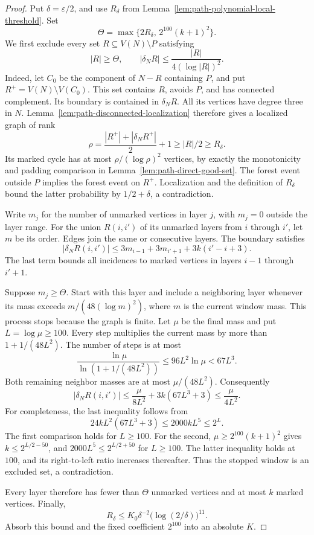 \begin{proof}
Put $\delta=\varepsilon/2$, and use $R_\delta$ from
Lemma~\ref{lem:path-polynomial-local-threshold}.
Set
\[
 \Theta=\max\{2R_\delta,\,2^{100}(k+1)^2\}.
\]
We first exclude every set $R\subseteq V(N)\setminus P$ satisfying
\[
 |R|\ge\Theta,
 \qquad
 |\delta_N R|\le\frac{|R|}{4(\log|R|)^2}.
\]
Indeed, let $C_0$ be the component of $N-R$ containing $P$, and put
$R^+=V(N)\setminus V(C_0)$.
This set contains $R$, avoids $P$, and has connected complement.
Its boundary is contained in $\delta_N R$.
All its vertices have degree three in $N$.
Lemma~\ref{lem:path-disconnected-localization} therefore gives a localized graph of rank
\[
 \rho=\frac{|R^+|+|\delta_N R^+|}{2}+1\ge|R|/2\ge R_\delta.
\]
Its marked cycle has at most $\rho/(\log\rho)^2$ vertices, by exactly the monotonicity and padding comparison in Lemma~\ref{lem:path-direct-good-set}.
The forest event outside $P$ implies the forest event on $R^+$.
Localization and the definition of $R_\delta$ bound the latter probability by
$1/2+\delta$, a contradiction.

Write $m_j$ for the number of unmarked vertices in layer $j$, with $m_j=0$ outside the layer range.
For the union $R(i,i')$ of its unmarked layers from $i$ through $i'$, let $m$ be its order.
Edges join the same or consecutive layers.
The boundary satisfies
\[
 |\delta_N R(i,i')|
 \le3m_{i-1}+3m_{i'+1}+3k(i'-i+3).
\]
The last term bounds all incidences to marked vertices in layers $i-1$ through $i'+1$.

Suppose $m_j\ge\Theta$.
Start with this layer and include a neighboring layer whenever its mass exceeds
$m/(48(\log m)^2)$, where $m$ is the current window mass.
This process stops because the graph is finite.
Let $\mu$ be the final mass and put $L=\log\mu\ge100$.
Every step multiplies the current mass by more than $1+1/(48L^2)$.
The number of steps is at most
\[
 \frac{\ln\mu}{\ln(1+1/(48L^2))}
 \le96L^2\ln\mu<67L^3.
\]
Both remaining neighbor masses are at most $\mu/(48L^2)$.
Consequently
\[
 |\delta_N R(i,i')|
 \le\frac{\mu}{8L^2}+3k(67L^3+3)
 \le\frac{\mu}{4L^2}.
\]
For completeness, the last inequality follows from
\[
 24kL^2(67L^3+3)\le2000kL^5\le2^L.
\]
The first comparison holds for $L\ge100$.
For the second, $\mu\ge2^{100}(k+1)^2$ gives $k\le2^{L/2-50}$, and
$2000L^5\le2^{L/2+50}$ for $L\ge100$.
The latter inequality holds at $100$, and its right-to-left ratio increases thereafter.
Thus the stopped window is an excluded set, a contradiction.

Every layer therefore has fewer than $\Theta$ unmarked vertices and at most $k$ marked vertices.
Finally,
\[
 R_\delta\le K_0\delta^{-2}\bigl(\log(2/\delta)\bigr)^{11}.
\]
Absorb this bound and the fixed coefficient $2^{100}$ into an absolute $K$.
\end{proof}

